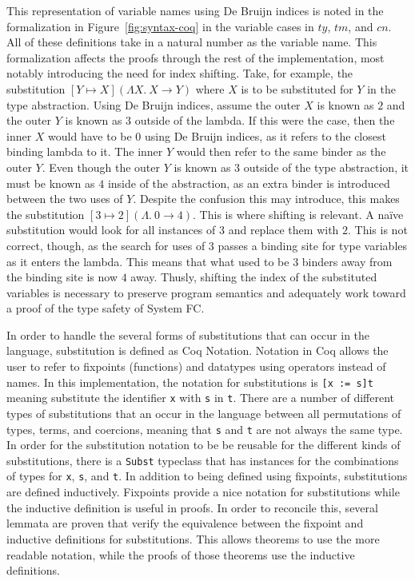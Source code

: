 \documentclass{sig-alternate}
\begin{document}
This representation of variable names using De Bruijn indices is noted in the formalization in Figure~\ref{fig:syntax-coq} in the variable cases in $ty$, $tm$, and $cn$. All of these definitions take in a natural number as the variable name. This formalization affects the proofs through the rest of the implementation, most notably introducing the need for index shifting. Take, for example, the substitution $[Y \mapsto X] (\Lambda X.\:X \rightarrow Y)$ where $X$ is to be substituted for $Y$ in the type abstraction. Using De Bruijn indices, assume the outer $X$ is known as $2$ and the outer $Y$ is known as $3$ outside of the lambda. If this were the case, then the inner $X$ would have to be $0$ using De Bruijn indices, as it refers to the closest binding lambda to it. The inner $Y$ would then refer to the same binder as the outer $Y$. Even though the outer $Y$ is known as $3$ outside of the type abstraction, it must be known as $4$ inside of the abstraction, as an extra binder is introduced between the two uses of $Y$. Despite the confusion this may introduce, this makes the substitution $[3 \mapsto 2] (\Lambda.\:0 \rightarrow 4)$. This is where shifting is relevant. A na\"ive substitution would look for all instances of $3$ and replace them with $2$. This is not correct, though, as the search for uses of $3$ passes a binding site for type variables as it enters the lambda. This means that what used to be $3$ binders away from the binding site is now $4$ away. Thusly, shifting the index of the substituted variables is necessary to preserve program semantics and adequately work toward a proof of the type safety of System FC.

In order to handle the several forms of substitutions that can occur in the language, substitution is defined as Coq Notation. Notation in Coq allows the user to refer to fixpoints (functions) and datatypes using operators instead of names. In this implementation, the notation for substitutions is \texttt{[x := s]t} meaning substitute the identifier \texttt{x} with \texttt{s} in \texttt{t}. There are a number of different types of substitutions that an occur in the language between all permutations of types, terms, and coercions, meaning that \texttt{s} and \texttt{t} are not always the same type. In order for the substitution notation to be be reusable for the different kinds of substitutions, there is a \texttt{Subst} typeclass that has instances for the combinations of types for \texttt{x}, \texttt{s}, and \texttt{t}. In addition to being defined using fixpoints, substitutions are defined inductively. Fixpoints provide a nice notation for substitutions while the inductive definition is useful in proofs. In order to reconcile this, several lemmata are proven that verify the equivalence between the fixpoint and inductive definitions for substitutions. This allows theorems to use the more readable notation, while the proofs of those theorems use the inductive definitions.
\end{document}
